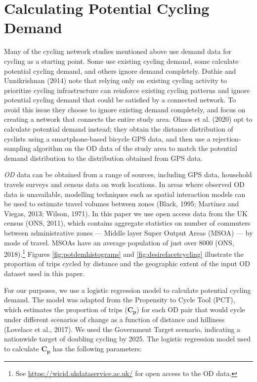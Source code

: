 \documentclass[
]{article}
\begin{document}
\hypertarget{calculating-potential-cycling-demand}{%
\section{Calculating Potential Cycling Demand}\label{calculating-potential-cycling-demand}}

Many of the cycling network studies mentioned above use demand data for cycling as a starting point.
Some use existing cycling demand, some calculate potential cycling demand, and others ignore demand completely.
Duthie and Unnikrishnan (2014) note that relying only on existing cycling activity to prioritize cycling
infrastructure can reinforce existing cycling patterns and ignore potential cycling demand that could be satisfied by a connected network.
To avoid this issue they choose to ignore existing demand completely, and focus on creating a network that connects the
entire study area.
Olmos et al. (2020) opt to calculate potential demand instead; they obtain the distance distribution of cyclists using a smartphone-based bicycle GPS data, and then use a rejection-sampling algorithm on the OD data of the study area to match
the potential demand distribution to the distribution obtained from GPS data.

\emph{OD} data can be obtained from a range of sources,
including GPS data, household travels surveys and census data on work
locations. In areas where observed OD data is unavailable, modelling
techniques such as spatial interaction models can be used to estimate
travel volumes between zones (Black, 1995; Martínez and Viegas, 2013; Wilson, 1971). In this paper we use open access data from the UK
census (ONS, 2011), which contains aggregate statistics on
number of commuters between administrative zones --- Middle layer Super
Output Areas (MSOA) --- by mode of travel. MSOAs have an average
population of just over 8000 (ONS, 2018).\footnote{ See
  \url{https://wicid.ukdataservice.ac.uk/} for open access to the OD data.}
Figures \ref{fig:potdemhistograms} and \ref{fig:desirefacetcycling}
illustrate the proportion of trips cycled by distance and the
geographic extent of the input OD dataset used in this paper.

For our purposes, we use a logistic regression model to calculate
potential cycling demand. The model was adapted from the Propensity to
Cycle Tool (PCT), which estimates the proportion of trips
(\(\boldsymbol{C_{p}}\)) for each OD pair that would cycle under
different scenarios of change as a
function of distance and hilliness (Lovelace et al., 2017). We used the Government Target scenario,
indicating a nationwide target of doubling cycling by 2025. The
logistic regression model used to calculate \(\boldsymbol{C_{p}}\) has
the following parameters:
\end{document}
